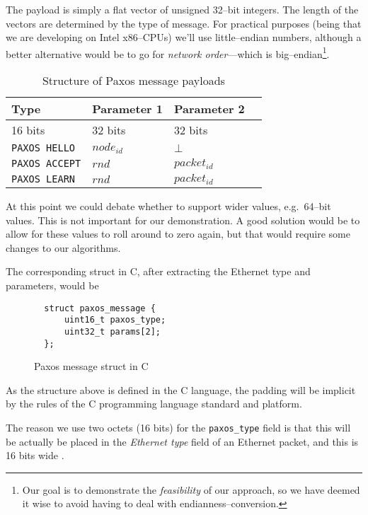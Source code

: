 The payload is simply a flat vector of unsigned 32--bit integers.  The length
of the vectors are determined by the type of message.  For practical
purposes (being that we are developing on Intel x86--CPUs) we'll use
little--endian numbers, although a better alternative would be to go for
\textit{network order}---which is big--endian\footnote{Our goal is to
demonstrate the \textit{feasibility} of our approach, so we have deemed it
wise to avoid having to deal with endianness--conversion.}.

\begin{table}[H]
  \centering
  \begin{tabular}{|l|l|l|l|}
    \hline \textbf{Type} & \textbf{Parameter 1} & \textbf{Parameter 2} \\
    \hline 16 bits & 32 bits & 32 bits \\
    \hline \texttt{PAXOS HELLO} & $node_{id}$ & $\bot$ \\
    \hline \texttt{PAXOS ACCEPT} & $rnd$ & $packet_{id}$ \\
    \hline \texttt{PAXOS LEARN} & $rnd$ & $packet_{id}$ \\
    \hline
  \end{tabular}
  \label{table:paxos.payload.structure}
  \caption{Structure of Paxos message payloads}
\end{table}

At this point we
could debate whether to support wider values, e.g.~64--bit values.
This is not important for our demonstration.  A good solution would be to
allow for these values to roll around to zero again, but that would require
some changes to our algorithms.

The corresponding struct in C, after extracting the Ethernet type and
parameters, would be

\begin{figure}[H]
  \begin{Verbatim}
  struct paxos_message {
      uint16_t paxos_type;
      uint32_t params[2];
  };
  \end{Verbatim}
  \label{struct:paxos.message}
  \caption{Paxos message struct in C}
\end{figure}

As the structure above is defined in the C language, the padding will be
implicit by the rules of the C programming language standard and platform.

The reason we use two octets (16 bits) for the \texttt{paxos\_{}type} field
is that this will be actually be placed in the \textit{Ethernet type} field
of an Ethernet packet, and this is 16 bits wide \cite{IEEE.802.3}.


